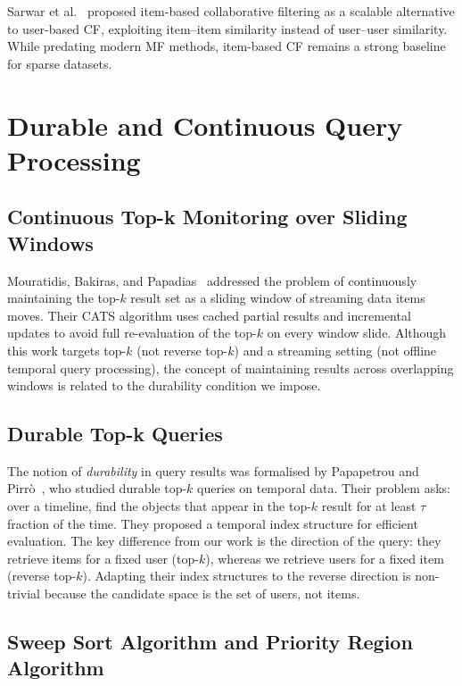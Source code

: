 Sarwar et al.~\cite{sarwar2001item} proposed item-based collaborative filtering as a scalable alternative to user-based CF, exploiting item--item similarity instead of user--user similarity. While predating modern MF methods, item-based CF remains a strong baseline for sparse datasets.

\section{Durable and Continuous Query Processing}

\subsection{Continuous Top-k Monitoring over Sliding Windows}

Mouratidis, Bakiras, and Papadias~\cite{mouratidis2006continuous} addressed the problem of continuously maintaining the top-$k$ result set as a sliding window of streaming data items moves. Their CATS algorithm uses cached partial results and incremental updates to avoid full re-evaluation of the top-$k$ on every window slide. Although this work targets top-$k$ (not reverse top-$k$) and a streaming setting (not offline temporal query processing), the concept of maintaining results across overlapping windows is related to the durability condition we impose.

\subsection{Durable Top-k Queries}

The notion of \textit{durability} in query results was formalised by Papapetrou and Pirrò~\cite{papapetrou2015durable}, who studied durable top-$k$ queries on temporal data. Their problem asks: over a timeline, find the objects that appear in the top-$k$ result for at least $\tau$ fraction of the time. They proposed a temporal index structure for efficient evaluation. The key difference from our work is the direction of the query: they retrieve items for a fixed user (top-$k$), whereas we retrieve users for a fixed item (reverse top-$k$). Adapting their index structures to the reverse direction is non-trivial because the candidate space is the set of users, not items.

\subsection{Sweep Sort Algorithm and Priority Region Algorithm}

